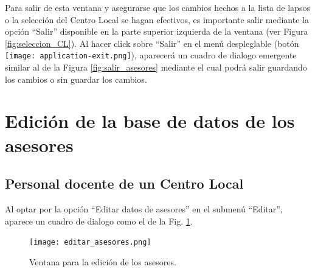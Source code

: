\documentclass[letterpaper,12pt]{book}
\begin{document}
Para salir de esta ventana y asegurarse que los cambios hechos a la lista de lapsos o la selección del Centro Local se hagan efectivos, es importante salir mediante la opción ``Salir'' disponible en la parte superior izquierda de la ventana (ver Figura \ref{fig:seleccion_CL}). Al hacer click sobre ``Salir'' en el menú despleglable (botón \texttt{[image: application-exit.png]}), aparecerá un cuadro de dialogo emergente similar al de la Figura \ref{fig:salir_asesores} mediante el cual podrá salir guardando los cambios o sin guardar los cambios. 

\section{Edición de la base de datos de los asesores}

\subsection{Personal docente de un Centro Local}

Al optar por la opción ``Editar datos de asesores'' en el submenú ``Editar'', aparece un cuadro de dialogo como el de la Fig. \ref{fig:editar_asesores}.\label{sec:editar_asesores}

\begin{figure}[!ht]
  \centering
  \texttt{[image: editar\_asesores.png]}
  \caption{Ventana para la edición de los asesores.}
  \label{fig:editar_asesores}
\end{figure}
\end{document}
